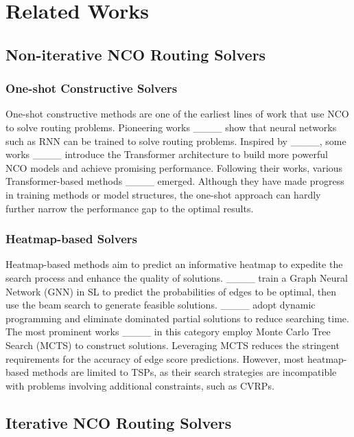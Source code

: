 \section{Related Works}
\subsection{Non-iterative NCO Routing Solvers}

\subsubsection{One-shot Constructive Solvers}
One-shot constructive methods are one of the earliest lines of work that use NCO to solve routing problems. Pioneering works ____ show that neural networks such as RNN can be trained to solve routing problems. Inspired by ____, some works
____ introduce the Transformer architecture to build more powerful NCO models and achieve promising performance. Following their works, various Transformer-based methods ____ emerged. Although they have made progress in training methods or model structures, the one-shot approach can hardly further narrow the performance gap to the optimal results. 

\subsubsection{Heatmap-based Solvers}
Heatmap-based methods aim to predict an informative heatmap to expedite the search process and enhance the quality of solutions. ____ train a Graph Neural Network (GNN) in SL to predict the probabilities of edges to be optimal, then use the beam search to generate feasible solutions. ____ adopt dynamic programming and eliminate dominated partial solutions to reduce searching time. The most prominent works ____ in this category employ Monte Carlo Tree Search (MCTS) to construct solutions. Leveraging MCTS reduces the stringent requirements for the accuracy of edge score predictions. However, most heatmap-based methods are limited to TSPs, as their search strategies are incompatible with problems involving additional constraints, such as CVRPs.

\subsection{Iterative NCO Routing Solvers}

